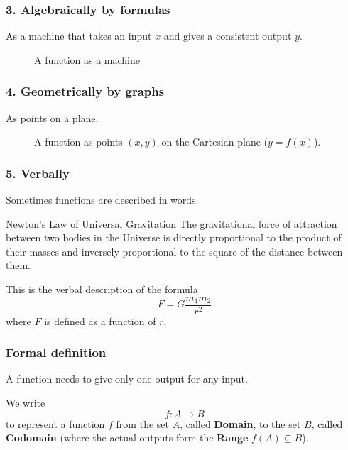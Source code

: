\begin{frame}
\frametitle{3. Algebraically by formulas}
As a machine that takes an input $x$ and gives a consistent output $y$.
\begin{figure}[h!]
\centering
{}
\caption{A function as a machine}
\end{figure}
\end{frame}

\begin{frame}
\frametitle{4. Geometrically by graphs}
As points on a plane.
\end{frame}

\begin{frame}
\begin{figure}[h!]
\centering
{}
\caption{A function as points $(x,y)$ on the Cartesian plane ($y = f(x)$).}
\end{figure}
\end{frame}

\begin{frame}
\frametitle{5. Verbally}
Sometimes functions are described in words.
\begin{remark}{Newton's Law of Universal Gravitation}
The gravitational force of attraction between two bodies in the Universe is directly proportional to the product of their masses and inversely proportional to the square of the distance between them.
\end{remark}
This is the verbal description of the formula
\[F = G \frac{m_1 m_2}{r^2}\]
where $F$ is defined as a function of $r$.
\end{frame}


\begin{frame}
\frametitle{Formal definition}
\begin{defn}{}{}
A function needs to give only one output for any input.
\medskip

We write 
\[ f: A \rightarrow B\] 
to represent a function $f$ from the set $A$, called \textbf{Domain}, to the set $B$, called \textbf{Codomain} (where the actual outputs form the \textbf{Range} $f(A) \subseteq B$).
\end{defn}
\end{frame}

